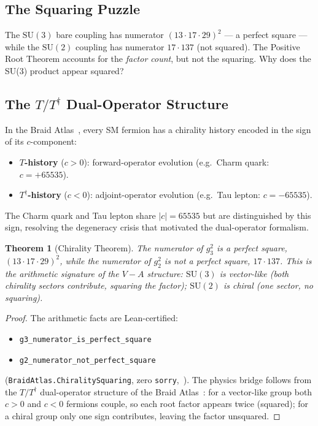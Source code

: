 \documentclass[11pt]{article}
\newtheorem{theorem}{Theorem}[section]
\theoremstyle{remark}
\begin{document}
\subsection{The Squaring Puzzle}

The $\mathrm{SU}(3)$ bare coupling has numerator $(13 \cdot 17 \cdot 29)^2$ --- a perfect
square --- while the $\mathrm{SU}(2)$ coupling has numerator $17 \cdot 137$ (not squared).
The Positive Root Theorem accounts for the \emph{factor count}, but not the squaring.
Why does the SU(3) product appear squared?

\subsection{The $T/T^\dagger$ Dual-Operator Structure}

In the Braid Atlas~\cite{SpivackBraidAtlas}, every SM fermion has a chirality history
encoded in the sign of its $c$-component:
\begin{itemize}
  \item \textbf{$T$-history} ($c > 0$): forward-operator evolution
        (e.g.\ Charm quark: $c = +65535$).
  \item \textbf{$T^\dagger$-history} ($c < 0$): adjoint-operator evolution
        (e.g.\ Tau lepton: $c = -65535$).
\end{itemize}
The Charm quark and Tau lepton share $|c| = 65535$ but are distinguished by this
sign, resolving the degeneracy crisis that motivated the dual-operator formalism.

\begin{theorem}[Chirality Theorem]
\label{thm:chirality}
The numerator of $g_3^2$ is a perfect square, $(13 \cdot 17 \cdot 29)^2$,
while the numerator of $g_2^2$ is not a perfect square, $17 \cdot 137$.
This is the arithmetic signature of the $V{-}A$ structure: $\mathrm{SU}(3)$ is
vector-like (both chirality sectors contribute, squaring the factor);
$\mathrm{SU}(2)$ is chiral (one sector, no squaring).
\end{theorem}

\begin{proof}
The arithmetic facts are Lean-certified:
\begin{itemize}[leftmargin=1.5em,itemsep=0pt,topsep=2pt]
  \item \texttt{g3\_nu\-mer\-a\-tor\_is\_per\-fect\_square}
  \item \texttt{g2\_nu\-mer\-a\-tor\_not\_per\-fect\_square}
\end{itemize}
(\texttt{BraidAtlas.ChiralitySquaring}, zero \texttt{sorry},~\cite{ugp-lean}).
The physics bridge follows from the $T/T^\dagger$ dual-operator structure of the
Braid Atlas~\cite{SpivackBraidAtlas}: for a vector-like group both $c > 0$ and
$c < 0$ fermions couple, so each root factor appears twice (squared); for a chiral
group only one sign contributes, leaving the factor unsquared.
\end{proof}
\end{document}
